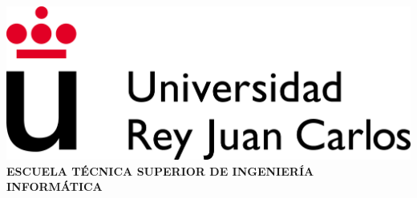 \documentclass[12pt]{article}
\begin{document}
	\begin{center}
		\includegraphics{images/logourjc}
		\Large\textbf{ESCUELA TÉCNICA SUPERIOR DE INGENIERÍA INFORMÁTICA}
	\end{center}
\end{document}
